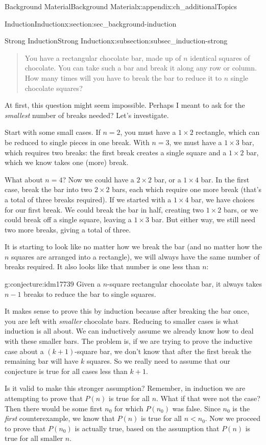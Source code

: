 \documentclass[oneside,10pt,]{book}
\numberwithin{equation}{chapter}
\newcommand{\lt}{<}
\begin{document}
\begin{appendixptx}{Background Material}{}{Background Material}{}{}{x:appendix:ch_additionalTopics}
\begin{sectionptx}{Induction}{}{Induction}{}{}{x:section:sec_background-induction}
\begin{subsectionptx}{Strong Induction}{}{Strong Induction}{}{}{x:subsection:subsec_induction-strong}
\begin{quote}%
You have a rectangular chocolate bar, made up of \(n\) identical squares of chocolate.  You can take such a bar and break it along any row or column.  How many times will you have to break the bar to reduce it to \(n\) single chocolate squares?%
\end{quote}
At first, this question might seem impossible.  Perhaps I meant to ask for the \emph{smallest} number of breaks needed?  Let's investigate.%
\par
Start with some small cases.  If \(n=2\), you must have a \(1\times 2\) rectangle, which can be reduced to single pieces in one break.  With \(n=3\), we must have a \(1\times 3\) bar, which requires two breaks: the first break creates a single square and a \(1\times 2\) bar, which we know takes one (more) break.%
\par
What about \(n=4\)?  Now we could have a \(2\times 2\) bar, or a \(1 \times 4\) bar.  In the first case, break the bar into two \(2\times 2\) bars, each which require one more break (that's a total of three breaks required).  If we started with a \(1 \times 4\) bar, we have choices for our first break.  We could break the bar in half, creating two \(1\times 2\) bars, or we could break off a single square, leaving a \(1\times 3\) bar.  But either way, we still need two more breaks, giving a total of three.%
\par
It is starting to look like no matter how we break the bar (and no matter how the \(n\) squares are arranged into a rectangle), we will always have the same number of breaks required.  It also looks like that number is one less than \(n\):%
\begin{conjecture}{}{}{g:conjecture:idm17739}%
Given a \(n\)-square rectangular chocolate bar, it always takes \(n-1\) breaks to reduce the bar to single squares.%
\end{conjecture}
It makes sense to prove this by induction because after breaking the bar once, you are left with \emph{smaller} chocolate bars.  Reducing to smaller cases is what induction is all about.  We can inductively assume we already know how to deal with these smaller bars.  The problem is, if we are trying to prove the inductive case about a \((k+1)\)-square bar, we don't know that after the first break the remaining bar will have \(k\) squares.  So we really need to assume that our conjecture is true for all cases less than \(k+1\).%
\par
Is it valid to make this stronger assumption?  Remember, in induction we are attempting to prove that \(P(n)\) is true for all \(n\).  What if that were not the case?  Then there would be some first \(n_0\) for which \(P(n_0)\) was false.  Since \(n_0\) is the \emph{first} counterexample, we know that \(P(n)\) is true for all \(n \lt n_0\).  Now we proceed to prove that \(P(n_0)\) is actually true, based on the assumption that \(P(n)\) is true for all smaller \(n\).%

\end{subsectionptx}
\end{sectionptx}
\end{appendixptx}
\end{document}
